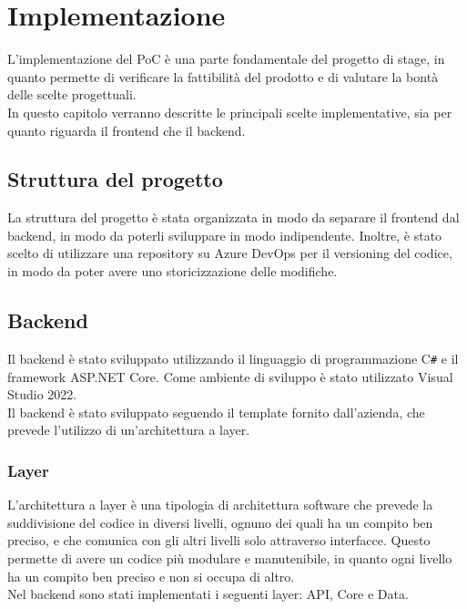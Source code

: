 \chapter{Implementazione}
\label{cap:implementazione}

L'implementazione del PoC è una parte fondamentale del progetto di stage, in quanto permette di verificare la fattibilità del prodotto e di valutare la bontà delle scelte progettuali.\\
In questo capitolo verranno descritte le principali scelte implementative, sia per quanto riguarda il frontend che il backend.\\

\section{Struttura del progetto}
La struttura del progetto è stata organizzata in modo da separare il frontend dal backend, in modo da poterli sviluppare in modo indipendente. Inoltre, è stato scelto di utilizzare una repository su Azure DevOps per il versioning del codice, in modo da poter avere uno storicizzazione delle modifiche.
\section{Backend}
Il backend è stato sviluppato utilizzando il linguaggio di programmazione C\texttt{\#} e il framework ASP.NET Core. 
Come ambiente di sviluppo è stato utilizzato Visual Studio 2022.\\
Il backend è stato sviluppato seguendo il template fornito dall'azienda, che prevede l'utilizzo di un'architettura a layer.\\
\subsection{Layer}
L'architettura a layer è una tipologia di architettura software che prevede la suddivisione del codice in diversi livelli, ognuno dei quali ha un compito ben preciso, e che comunica con gli altri livelli solo attraverso interfacce. Questo permette di avere un codice più modulare e manutenibile, in quanto ogni livello ha un compito ben preciso e non si occupa di altro.\\
Nel backend sono stati implementati i seguenti layer: API, Core e Data.\\

